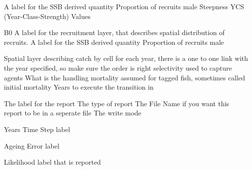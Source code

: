  {A label for the SSB derived quantity}
 {Proportion of recruits male}
 {}
 {Steepness}
 {YCS (Year-Class-Strength) Values}
\par\textbf{}\par
{} {B0}
 {A label for the recruitment layer, that describes spatial distribution of recruits.}
 {A label for the SSB derived quantity}
 {Proportion of recruits male}
 {}
\par\textbf{}\par
{} {Spatial layer describing catch by cell for each year, there is a one to one link with the year specified, so make sure the order is right}
 {selectivity used to capture agents}
 {What is the handling mortality assumed for tagged fish, sometimes called initial mortality}
 {Years to execute the transition in}
\par\par
{} {The label for the report}
 {The type of report}
 {The File Name if you want this report to be in a seperate file}
 {The write mode}
\par\textbf{}\par
{} {Years}
 {Time Step label}
\par\textbf{}\par
{} {Ageing Error label}
\par\textbf{}\par
\par\textbf{}\par
\par\textbf{}\par
{} {Likelihood label that is reported}
\par\textbf{}\par
\par\textbf{}\par
